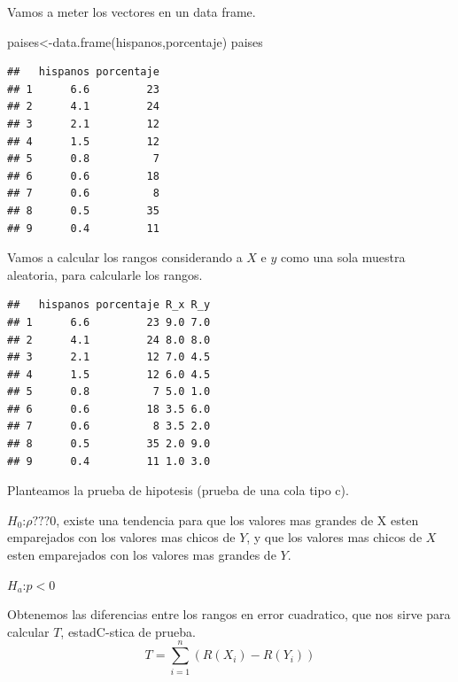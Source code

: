 \documentclass[
]{article}
\newenvironment{Shaded}{\begin{snugshade}}{\end{snugshade}}
\newcommand{\FunctionTok}[1]{\textcolor[rgb]{0.00,0.00,0.00}{#1}}
\newcommand{\NormalTok}[1]{#1}
\newcommand{\OtherTok}[1]{\textcolor[rgb]{0.56,0.35,0.01}{#1}}
\newcommand{\SpecialCharTok}[1]{\textcolor[rgb]{0.00,0.00,0.00}{#1}}
\begin{document}
Vamos a meter los vectores en un data frame.

\begin{Shaded}
\begin{Highlighting}[]
\NormalTok{paises}\OtherTok{\textless{}{-}}\FunctionTok{data.frame}\NormalTok{(hispanos,porcentaje)}
\NormalTok{paises}
\end{Highlighting}
\end{Shaded}

\begin{verbatim}
##   hispanos porcentaje
## 1      6.6         23
## 2      4.1         24
## 3      2.1         12
## 4      1.5         12
## 5      0.8          7
## 6      0.6         18
## 7      0.6          8
## 8      0.5         35
## 9      0.4         11
\end{verbatim}

Vamos a calcular los rangos considerando a \(X\) e \(y\) como una sola
muestra aleatoria, para calcularle los rangos.

\begin{Shaded}
\end{Shaded}

\begin{verbatim}
##   hispanos porcentaje R_x R_y
## 1      6.6         23 9.0 7.0
## 2      4.1         24 8.0 8.0
## 3      2.1         12 7.0 4.5
## 4      1.5         12 6.0 4.5
## 5      0.8          7 5.0 1.0
## 6      0.6         18 3.5 6.0
## 7      0.6          8 3.5 2.0
## 8      0.5         35 2.0 9.0
## 9      0.4         11 1.0 3.0
\end{verbatim}

Planteamos la prueba de hipotesis (prueba de una cola tipo c).

\(H_{0}\):\(\rho ??? 0\), existe una tendencia para que los valores mas
grandes de X esten emparejados con los valores mas chicos de \(Y\), y
que los valores mas chicos de \(X\) esten emparejados con los valores
mas grandes de \(Y\).

\(H_{a}\):\(p<0\)

Obtenemos las diferencias entre los rangos en error cuadratico, que nos
sirve para calcular \(T\), estadC-stica de prueba.
\[T= \sum_{i=1}^{n} (R(X_{i}) - R(Y_{i})    ) \]
\end{document}
